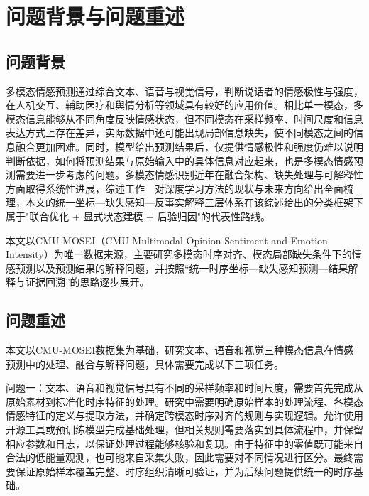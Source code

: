 \documentclass[colorprint,nocoverzero]{gmcmthesis}
\begin{document}
\clearpage
\maketoc
\clearpage

\section{问题背景与问题重述}


\subsection{问题背景}

多模态情感预测通过综合文本、语音与视觉信号，判断说话者的情感极性与强度，在人机交互、辅助医疗和舆情分析等领域具有较好的应用价值。相比单一模态，多模态信息能够从不同角度反映情感状态，但不同模态在采样频率、时间尺度和信息表达方式上存在差异，实际数据中还可能出现局部信息缺失，使不同模态之间的信息融合更加困难。同时，模型给出预测结果后，仅提供情感极性和强度仍难以说明判断依据，如何将预测结果与原始输入中的具体信息对应起来，也是多模态情感预测需要进一步考虑的问题。多模态情感识别近年在融合架构、缺失处理与可解释性方面取得系统性进展，综述工作~\cite{zhang2024survey}~对深度学习方法的现状与未来方向给出全面梳理，本文的统一坐标—缺失感知—反事实解释三层体系在该综述给出的分类框架下属于"联合优化 + 显式状态建模 + 后验归因"的代表性路线。

本文以CMU-MOSEI（CMU Multimodal Opinion Sentiment and Emotion Intensity）\cite{zadeh2018mosei,zadeh2017tfn}为唯一数据来源，主要研究多模态时序对齐、模态局部缺失条件下的情感预测以及预测结果的解释问题，并按照“统一时序坐标—缺失感知预测—结果解释与证据回溯”的思路逐步展开。

\subsection{问题重述}

本文以CMU-MOSEI数据集为基础，研究文本、语音和视觉三种模态信息在情感预测中的处理、融合与解释问题，具体需要完成以下三项任务。

问题一：文本、语音和视觉信号具有不同的采样频率和时间尺度，需要首先完成从原始素材到标准化时序特征的处理。研究中需要明确原始样本的处理流程、各模态情感特征的定义与提取方法，并确定跨模态时序对齐的规则与实现逻辑。允许使用开源工具或预训练模型完成基础处理，但相关规则需要落实到具体流程中，并保留相应参数和日志，以保证处理过程能够核验和复现。由于特征中的零值既可能来自合法的低能量观测，也可能来自采集失败，因此需要对不同情况进行区分。最终需要保证原始样本覆盖完整、时序组织清晰可验证，并为后续问题提供统一的时序基础。
\end{document}
